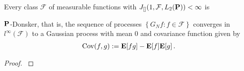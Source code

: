 \begin{theorem}
  Every class $\mathcal{F}$ of measurable functions 
  with
  $
    J
    _{[]}
    (
    1
    ,
    \mathcal{F}
    ,
    L_2(\P)
    )
    <\infty
  $
  is

  $\P$-Donsker, that is,
  the sequence of processes 
$\left\{ G_N f \colon f\in\mathcal{F}\right\}$
  converges 
  in
$l^\infty(\mathcal{F})$
to a Gaussian process with mean 0 and covariance function given by
\begin{gather}
  \mathrm{Cov}(f,g)
  :=
  \E[fg]-\E[f]\E[g]
  \,.
\end{gather}
\end{theorem}
\begin{proof}
  \cite[Theorem~19.5]{Vaart2000}
\end{proof}



